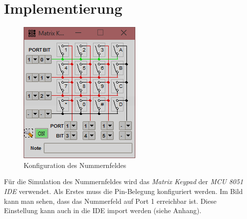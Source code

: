 
\chapter{Implementierung}\label{implementierung}

\begin{figure}[htbp]
\centering
\includegraphics{images/keypad-screenshot}
\caption{Konfiguration des Nummernfeldes}
\end{figure}

Für die Simulation des Nummernfeldes wird das \emph{Matrix Keypad} der
\emph{MCU 8051 IDE} verwendet. Als Erstes muss die Pin-Belegung
konfiguriert werden. Im Bild kann man sehen, dass das Nummerfeld auf
Port 1 erreichbar ist. Diese Einstellung kann auch in die IDE import
werden (siehe Anhang).

\begin{Shaded}
\begin{Highlighting}[]
 
         
         
         

 
\end{Highlighting}
\end{Shaded}

